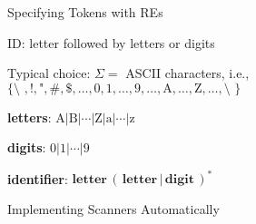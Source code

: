 \documentclass{plt}
\begin{document}
\begin{frame}{Specifying Tokens with REs}

ID: letter followed by letters or digits

\vspace{1pc}

Typical choice: $\Sigma = $ ASCII characters, i.e., $\{
\texttt{\char`\ }, !, \texttt{"}, \#, \$, \ldots, \textrm{0},
\textrm{1}, \ldots, \textrm{9},
\ldots, \textrm{A}, \ldots, \textrm{Z}, \ldots, \texttt{\char`\~} \}$

\textbf{letters}: $\textrm{A} | \textrm{B} | \cdots | \textrm{Z} |
\textrm{a} | \cdots | \textrm{z}$

\textbf{digits}: $\textrm{0} | \textrm{1} | \cdots | \textrm{9}$

\textbf{identifier}: $\textbf{letter}\, (\, \textbf{letter}\, | \,
\textbf{digit}\, )^*$

\end{frame}

\begin{frame}{Implementing Scanners Automatically}

\begin{center}
\end{center}

\end{frame}
\end{document}
